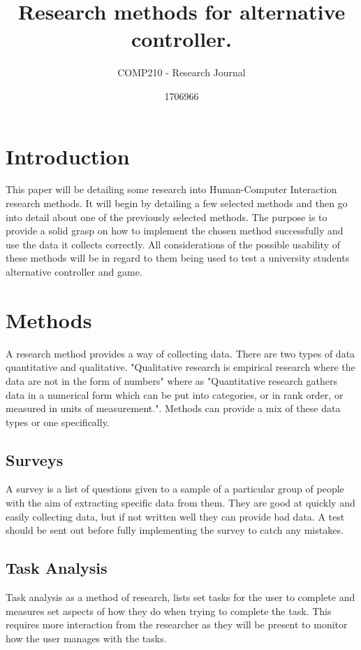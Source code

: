 \documentclass{scrartcl}
\title{Research methods for alternative controller.}
\subtitle{COMP210 - Research Journal}
\author{1706966}
\begin{document}
	
	\maketitle
	
	
	\section{Introduction}
		This paper will be detailing some research into Human-Computer Interaction research methods. It will begin by detailing a few selected methods and then go into detail about one of the previously selected methods. The purpose is to provide a solid grasp on how to implement the chosen method successfully and use the data it collects correctly. All considerations of the possible usability of these methods will be in regard to them being used to test a university students alternative controller and game.
		
	\section{Methods}
		A research method provides a way of collecting data. There are two types of data quantitative and qualitative. "Qualitative research is empirical research where the data are not in the form of numbers"\citep{punch2013introduction} where as "Quantitative research gathers data in a numerical form which can be put into categories, or in rank order, or measured in units of measurement."\cite{simplePsych1}. Methods can provide a mix of these data types or one specifically.

	\subsection{Surveys}
		A survey is a list of questions given to a sample of a particular group of people with the aim of extracting specific data from them. They are good at quickly and easily collecting data, but if not written well they can provide bad data\citep{litwin1995measure}. A test should be sent out before fully implementing the survey to catch any mistakes. 
		
	\subsection{Task Analysis}
		Task analysis as a method of research, lists set tasks for the user to complete and measures set aspects of how they do when trying to complete the task.   This requires more interaction from the researcher as they will be present to monitor how the user manages with the tasks\citep{diaper2003handbook}.
		
\end{document}
